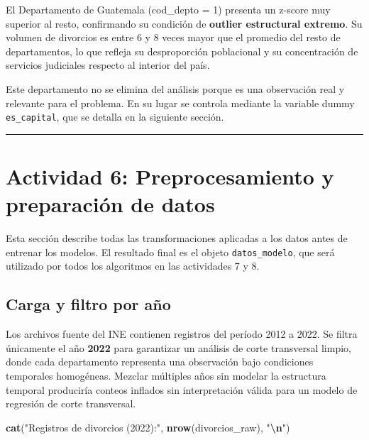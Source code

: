 \documentclass[
]{article}
\newenvironment{Shaded}{\begin{snugshade}}{\end{snugshade}}
\newcommand{\FunctionTok}[1]{\textcolor[rgb]{0.13,0.29,0.53}{\textbf{#1}}}
\newcommand{\NormalTok}[1]{#1}
\newcommand{\SpecialCharTok}[1]{\textcolor[rgb]{0.81,0.36,0.00}{\textbf{#1}}}
\newcommand{\StringTok}[1]{\textcolor[rgb]{0.31,0.60,0.02}{#1}}
\begin{document}
El Departamento de Guatemala (cod\_depto = 1) presenta un z-score muy
superior al resto, confirmando su condición de \textbf{outlier
estructural extremo}. Su volumen de divorcios es entre 6 y 8 veces mayor
que el promedio del resto de departamentos, lo que refleja su
desproporción poblacional y su concentración de servicios judiciales
respecto al interior del país.

Este departamento no se elimina del análisis porque es una observación
real y relevante para el problema. En su lugar se controla mediante la
variable dummy \texttt{es\_capital}, que se detalla en la siguiente
sección.

\begin{center}\rule{0.5\linewidth}{0.5pt}\end{center}

\hypertarget{actividad-6-preprocesamiento-y-preparaciuxf3n-de-datos}{%
\section{Actividad 6: Preprocesamiento y preparación de
datos}\label{actividad-6-preprocesamiento-y-preparaciuxf3n-de-datos}}

Esta sección describe todas las transformaciones aplicadas a los datos
antes de entrenar los modelos. El resultado final es el objeto
\texttt{datos\_modelo}, que será utilizado por todos los algoritmos en
las actividades 7 y 8.

\hypertarget{carga-y-filtro-por-auxf1o}{%
\subsection{Carga y filtro por año}\label{carga-y-filtro-por-auxf1o}}

Los archivos fuente del INE contienen registros del período 2012 a 2022.
Se filtra únicamente el año \textbf{2022} para garantizar un análisis de
corte transversal limpio, donde cada departamento representa una
observación bajo condiciones temporales homogéneas. Mezclar múltiples
años sin modelar la estructura temporal produciría conteos inflados sin
interpretación válida para un modelo de regresión de corte transversal.

\begin{Shaded}
\begin{Highlighting}[]
\FunctionTok{cat}\NormalTok{(}\StringTok{"Registros de divorcios (2022):"}\NormalTok{, }\FunctionTok{nrow}\NormalTok{(divorcios\_raw), }\StringTok{"}\SpecialCharTok{\textbackslash{}n}\StringTok{"}\NormalTok{)}
\end{Highlighting}
\end{Shaded}
\end{document}
